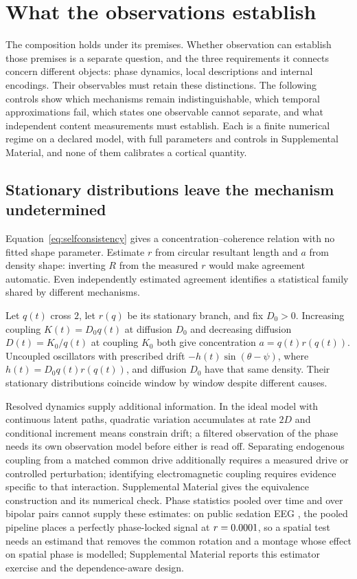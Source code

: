 \documentclass[12pt]{article}
\renewcommand{\cite}[1]{\citep{#1}}
\begin{document}
\section{What the observations establish}
\label{sec:observations}

The composition holds under its premises. Whether observation can establish those premises is a separate question, and the three requirements it connects concern different objects: phase dynamics, local descriptions and internal encodings. Their observables must retain these distinctions. The following controls show which mechanisms remain indistinguishable, which temporal approximations fail, which states one observable cannot separate, and what independent content measurements must establish. Each is a finite numerical regime on a declared model, with full parameters and controls in Supplemental Material, and none of them calibrates a cortical quantity.

\subsection{Stationary distributions leave the mechanism undetermined}
\label{sec:identifiability}

Equation~\eqref{eq:selfconsistency} gives a concentration--coherence relation with no fitted shape parameter. Estimate $r$ from circular resultant length and $a$ from density shape: inverting $R$ from the measured $r$ would make agreement automatic. Even independently estimated agreement identifies a statistical family shared by different mechanisms.

Let $q(t)$ cross $2$, let $r(q)$ be its stationary branch, and fix $D_0>0$. Increasing coupling $K(t)=D_0q(t)$ at diffusion $D_0$ and decreasing diffusion $D(t)=K_0/q(t)$ at coupling $K_0$ both give concentration $a=q(t)r(q(t))$. Uncoupled oscillators with prescribed drift $-h(t)\sin(\theta-\psi)$, where $h(t)=D_0q(t)r(q(t))$, and diffusion $D_0$ have that same density. Their stationary distributions coincide window by window despite different causes.

Resolved dynamics supply additional information. In the ideal model with continuous latent paths, quadratic variation accumulates at rate $2D$ and conditional increment means constrain drift; a filtered observation of the phase needs its own observation model before either is read off. Separating endogenous coupling from a matched common drive additionally requires a measured drive or controlled perturbation; identifying electromagnetic coupling requires evidence specific to that interaction. Supplemental Material gives the equivalence construction and its numerical check. Phase statistics pooled over time and over bipolar pairs cannot supply these estimates: on public sedation EEG \cite{bajwa2025}, the pooled pipeline places a perfectly phase-locked signal at $r=0.0001$, so a spatial test needs an estimand that removes the common rotation and a montage whose effect on spatial phase is modelled; Supplemental Material reports this estimator exercise and the dependence-aware design.
\end{document}
